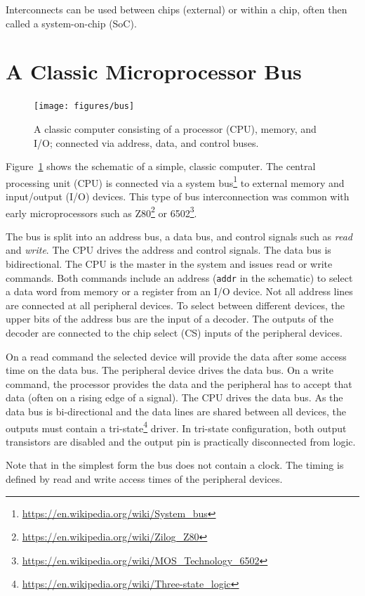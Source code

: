 \documentclass[%
    10pt,
    headinclude, footexclude,
    openright, %
    notitlepage,
    cleardoubleempty,
    headsepline,
    pointlessnumbers,
    bibtotoc, idxtotoc,
    ]{scrbook}
\newcommand{\code}[1]{{\small{\texttt{#1}}}}
\newcommand{\myref}[2]{\href{#1}{#2}}
\renewcommand{\myref}[2]{{#2}{\footnote{\url{#1}}}}
\begin{document}
Interconnects can be used between chips (external) or within a chip, often
then called a system-on-chip (SoC).

\section{A Classic Microprocessor Bus}
\label{sect:bus}

\begin{figure}
  \centering
  \texttt{[image: figures/bus]}
  \caption{A classic computer consisting of a processor (CPU), memory, and I/O;
  connected via address, data, and control buses.}
  \label{fig:bus}
\end{figure}

Figure~\ref{fig:bus} shows the schematic of a simple, classic computer.
The central processing unit (CPU) is connected via a
\myref{https://en.wikipedia.org/wiki/System_bus}{system bus} to
external memory and input/output (I/O) devices.
This type of bus interconnection was common with early microprocessors
such as \myref{https://en.wikipedia.org/wiki/Zilog_Z80}{Z80} or
\myref{https://en.wikipedia.org/wiki/MOS_Technology_6502}{6502}.

The bus is split into an address bus, a data bus, and control signals
such as \emph{read} and \emph{write}.
The CPU drives the address and control signals. The data bus is bidirectional.
The CPU is the master in the system and issues read or write commands.
Both commands include an address (\code{addr} in the schematic) to select
a data word from memory or a register from an I/O device.
Not all address lines are connected at all peripheral devices.
To select between different devices, the upper bits of the address bus are the
input of a decoder. The outputs of the decoder are connected to the chip select (CS)
inputs of the peripheral devices.

On a read command the selected device will provide the data after some access time
on the data bus. The peripheral device drives the data bus.
On a write command, the processor provides the data and the peripheral has to
accept that data (often on a rising edge of a signal). The CPU drives the data bus.
As the data bus is bi-directional and the data lines are shared between all devices,
the outputs must contain a \myref{https://en.wikipedia.org/wiki/Three-state_logic}{tri-state}
driver. In tri-state configuration, both output transistors are disabled and the output pin
is practically disconnected from logic.

Note that in the simplest form the bus does not contain a clock. The timing is defined by
read and write access times of the peripheral devices.
\end{document}

